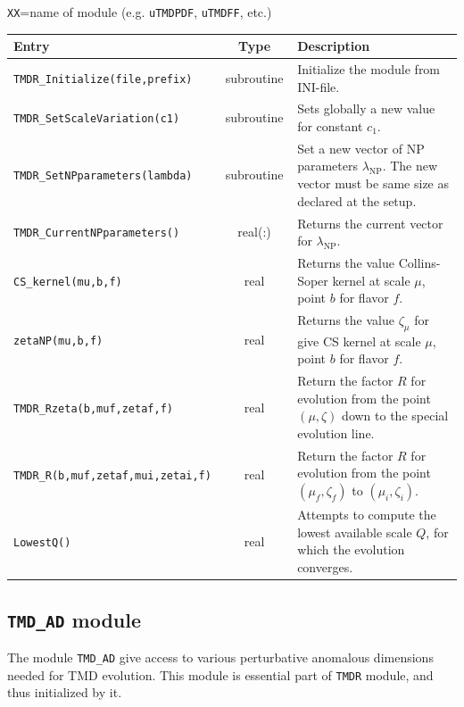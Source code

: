 \documentclass[prd,nofootinbib,eqsecnum,final]{revtex4}
\renewcommand{\(}{\left(}
\renewcommand{\)}{\right)}
\renewcommand{\[}{\left[}
\renewcommand{\]}{\right]}
\begin{document}
\begin{center}
\texttt{XX}=name of module (e.g. \texttt{uTMDPDF}, \texttt{uTMDFF}, etc.)
\\
\begin{tabular}{||p{5.5cm}||c||p{8.5cm}||}
\hline\hline
Entry &~~Type~~& Description
\\\hline
\texttt{TMDR\_Initialize(file,prefix)} & subroutine & Initialize the module from INI-file.
\\\hline
\texttt{TMDR\_SetScaleVariation(c1)} & subroutine & Sets globally a new value for constant $c_1$.
\\\hline
\texttt{TMDR\_SetNPparameters(lambda)} & subroutine & Set a new vector of NP parameters $\lambda_{\text{NP}}$. The new vector must be same size as declared at the setup.
\\\hline
\texttt{TMDR\_CurrentNPparameters()} & real(:) & Returns the current vector for $\lambda_{\text{NP}}$.
\\\hline\hline
\texttt{CS\_kernel(mu,b,f)} & real & Returns the value Collins-Soper kernel at scale $\mu$, point $b$ for flavor $f$.
\\\hline
\texttt{zetaNP(mu,b,f)} & real & Returns the value $\zeta_\mu$ for give CS kernel at scale $\mu$, point $b$ for flavor $f$.
\\\hline
\texttt{TMDR\_Rzeta(b,muf,zetaf,f)} & real & Return the factor $R$ for evolution from the point $(\mu,\zeta)$ down to the special evolution line.
\\\hline
\texttt{TMDR\_R(b,muf,zetaf,mui,zetai,f)} & real & Return the factor $R$ for evolution from the point $(\mu_f,\zeta_f)$ to $(\mu_i,\zeta_i)$.
\\\hline
\texttt{LowestQ()} & real & Attempts to compute the lowest available scale $Q$, for which the evolution converges.
\\\hline\hline
\end{tabular}
\end{center}

\subsection{\texttt{TMD\_AD} module}
\label{TMD_AD}

The module \texttt{TMD\_AD} give access to various perturbative anomalous dimensions needed for TMD evolution. This module is essential part of \texttt{TMDR} module, and thus initialized by it. 
\end{document}
